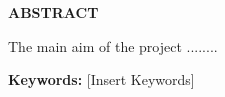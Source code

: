 \begin{center}
{\Large{\bf{ABSTRACT}}}
\end{center}


The main aim of the project ........

\vspace{4cm} %
\textbf{Keywords:} [Insert Keywords]

\clearpage